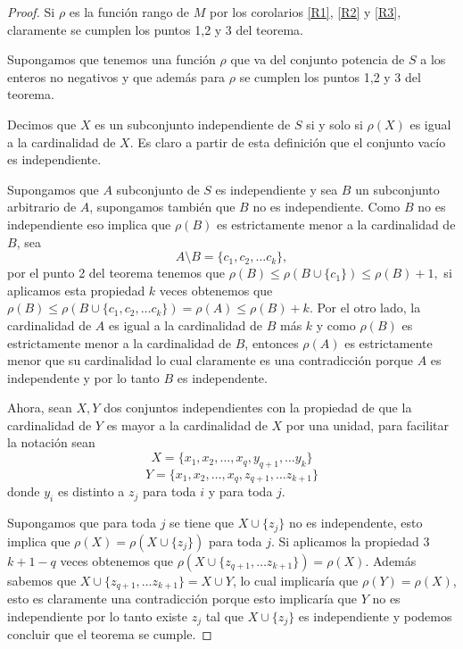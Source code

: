 \begin{proof}
Si $\rho $ es la función rango de $M$ por los corolarios \ref{R1}, \ref{R2} y \ref{R3}, claramente se cumplen los puntos 1,2 y 3 del teorema. 

Supongamos que tenemos una función $\rho$ que va del conjunto potencia de $S$ a los enteros no negativos y que además para $\rho$ se cumplen los puntos 1,2 y 3 del teorema. 

Decimos que $X$ es un subconjunto independiente de $S$ si y solo si $\rho(X)$ es igual a la cardinalidad de $X$. Es claro a partir de esta definición que el conjunto vacío es independiente. 

Supongamos que $A$ subconjunto de $S$ es independiente y sea $B$ un subconjunto arbitrario de $A$, supongamos también que $B$ no es independiente. Como $B$ no es independiente eso implica que $\rho(B)$ es estrictamente menor a la cardinalidad de $B$, sea 
$$A \setminus B = \{ c_1, c_2, \dots c_k\},$$
por el punto 2 del teorema tenemos que $\rho(B) \leq \rho(B \cup \{c_1\}) \leq \rho(B)+1,$ si aplicamos esta propiedad $k$ veces obtenemos que $\rho(B) \leq \rho(B \cup \{ c_1, c_2, \dots c_k\}) = \rho(A) \leq \rho(B)+k.$ Por el otro lado, la cardinalidad de $A$ es igual a la cardinalidad de $B$ más $k$ y como $\rho(B)$ es estrictamente menor a la cardinalidad de $B$, entonces $\rho(A)$ es estrictamente menor que su cardinalidad lo cual claramente es una contradicción porque $A$ es independente y por lo tanto $B$ es independente. 

Ahora, sean $X,Y$ dos conjuntos independientes con la propiedad de que la cardinalidad de $Y$ es mayor a la cardinalidad de $X$ por una unidad, para facilitar la notación sean 
$$X = \{ x_1,x_2,\dots, x_q, y_{q+1}, \dots y_k\}$$
$$Y = \{ x_1,x_2,\dots, x_q, z_{q+1}, \dots z_{k+1}\}$$
donde $y_i$ es distinto a $z_j$ para toda $i$ y para toda $j$. 

Supongamos que para toda $j$ se tiene que $X \cup \{z_j\}$ no es independente, esto implica que $\rho(X) =\rho(X \cup \{z_j\})$ para toda $j$. Si aplicamos la propiedad 3 $k+1-q$ veces obtenemos que $\rho(X \cup \{ z_{q+1}, \dots z_{k+1} \} )= \rho(X)$. Además sabemos que $X \cup \{ z_{q+1}, \dots z_{k+1} \}= X \cup Y$, lo cual implicaría que $\rho(Y) = \rho (X)$, esto es claramente una contradicción porque esto implicaría que $Y$ no es independiente por lo tanto existe $z_j$ tal que $X \cup \{z_j\}$ es independiente y podemos concluir que el teorema se cumple.
\end{proof}

